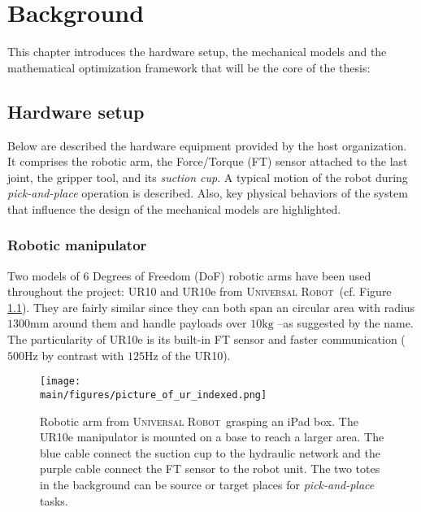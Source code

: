 \documentclass[/home/francois/latex/report/main.tex]{subfiles}
\begin{document}
\chapter{Background}
\label{chapter:background}

This chapter introduces the hardware setup, the mechanical models and the mathematical optimization framework that will be the core of the thesis:

\section{Hardware setup}
\label{section:hardware}

Below are described the hardware equipment provided by the host organization. It comprises the robotic arm, the Force/Torque (FT) sensor attached to the last joint, the gripper tool, and its \textit{suction cup}. A typical motion of the robot during \textit{pick-and-place} operation is described. Also, key physical behaviors of the system that influence the design of the mechanical models are highlighted.

\subsection{Robotic manipulator}

Two models of 6 Degrees of Freedom (DoF) robotic arms have been used throughout the project: UR10 and UR10e from \textsc{Universal Robot}\texttrademark \ (cf. Figure \ref{fig:background:stanislaw}). They are fairly similar since they can both span an circular area with radius $1300 \si{\milli\meter}$ around them and handle payloads over $10 \si{\kilo\gram}$ –as suggested by the name. The particularity of UR10e is its built-in \ac{FT} sensor and faster communication ($500 \si{\hertz}$ by contrast with $125 \si{\hertz}$ of the UR10).

\begin{figure}[h]
  \centering
  \texttt{[image: \\main/figures/picture\_of\_ur\_indexed.png]}
  \caption{Robotic arm from \textsc{Universal Robot}\texttrademark \ grasping an iPad box. The UR10e manipulator is mounted on a base to reach a larger area. The blue cable connect the suction cup to the hydraulic network and the purple cable connect the \ac{FT} sensor to the robot unit. The two totes in the background can be source or target places for \textit{pick-and-place} tasks.}
  \label{fig:background:stanislaw}
\end{figure}
\end{document}
